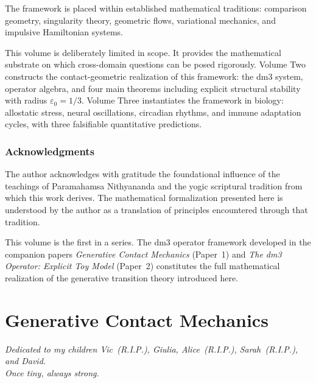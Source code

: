 \documentclass[12pt, oneside]{book}
\theoremstyle{plain}
\theoremstyle{definition}
\theoremstyle{remark}
\begin{document}
The framework is placed within established mathematical traditions:
comparison geometry, singularity theory, geometric flows, variational
mechanics, and impulsive Hamiltonian systems.

This volume is deliberately limited in scope. It provides the
mathematical substrate on which cross-domain questions can be posed
rigorously. Volume Two constructs the contact-geometric realization
of this framework: the dm3 system, operator algebra, and four main
theorems including explicit structural stability with radius
$\varepsilon_0 = 1/3$. Volume Three instantiates the framework in
biology: allostatic stress, neural oscillations, circadian rhythms,
and immune adaptation cycles, with three falsifiable quantitative
predictions.

\section*{Acknowledgments}

The author acknowledges with gratitude the foundational influence of
the teachings of Paramahamsa Nithyananda and the yogic scriptural
tradition from which this work derives. The mathematical formalization
presented here is understood by the author as a translation of
principles encountered through that tradition.

This volume is the first in a series. The dm3 operator framework
developed in the companion papers \emph{Generative Contact Mechanics}
(Paper~1) and \emph{The dm3 Operator: Explicit Toy Model} (Paper~2)
constitutes the full mathematical realization of the generative
transition theory introduced here.
\cleardoublepage


\part{Generative Contact Mechanics}

\begin{center}
\emph{Dedicated to my children Vic~(R.I.P.), Giulia,
  Alice~(R.I.P.), Sarah~(R.I.P.), and David.}\\[4pt]
\emph{Once tiny, always strong.}
\end{center}

\vspace{1.5em}
\newpage
\end{document}
